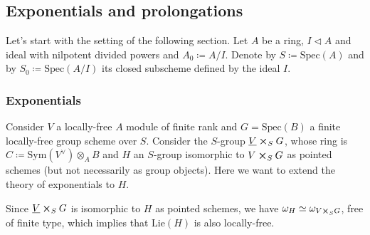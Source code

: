\documentclass[../Main]{subfiles}
\begin{document}
\subsection{Exponentials and prolongations}
Let's start with the setting of the following section.
Let $A$ be a ring, $I \triangleleft A$ and ideal with nilpotent
divided powers and $A_0 \coloneqq A/I$.
Denote by $S \coloneqq \mathrm{Spec}(A)$
and by $S_0 \coloneqq \mathrm{Spec}(A/I)$ its closed
subscheme defined by the ideal $I$.



\subsubsection{Exponentials}
Consider $V$ a locally-free $A$ module of finite rank
and $G = \mathrm{Spec}(B)$ a finite locally-free 
group scheme over $S$.
Consider the $S$-group $\underline{V} \cross_{ S } G$, whose ring is
$C \coloneqq \mathrm{Sym}(V^\vee) \otimes_A B$ and $H$ an $S$-group isomorphic
to $V \cross_{ S } G$ as pointed schemes (but not necessarily
as group objects).
Here we want to extend the theory of exponentials to $H$.




\begin{rem}[]
	Since $\underline{V} \cross_{ S } G$ is isomorphic to $H$ as pointed
	schemes, we have $\omega_H \simeq \omega_{V \cross_S G}$, free of finite type,
	which implies that $\mathrm{Lie}(H)$ is also locally-free.
\end{rem}
\end{document}
